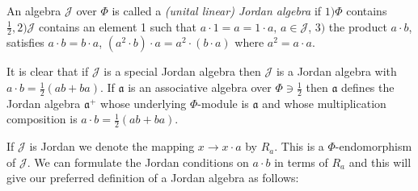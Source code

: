 \begin{dashdefi}
  An algebra $\mathscr{J}$ over $\Phi$ is called a {\em (unital
    linear) Jordan algebra} if $1) \Phi$ contains $\frac{1}{2}, 2)
  \mathscr{J}$ contains an element 1 such that $a\cdot 1=a=1\cdot a,\, a\in \mathscr{J}$,
  $3)$ the product $a\cdot b$, satisfies $a\cdot b=b\cdot a$,
  $(a^{2}\cdot b)\cdot a=a^{2}\cdot (b\cdot a)$ where $a^{2}=a\cdot
  a$. 

  It is clear that if $\mathscr{J}$ is a special Jordan algebra then
  $\mathscr{J}$ is  a Jordan algebra with $a\cdot
  b=\frac{1}{2}(ab+ba)$. If $\mathfrak{a}$ is an associative algebra
  over $\Phi \ni\frac{1}{2}$ then $\mathfrak{a}$ defines the Jordan
  algebra $\mathfrak{a}^{+}$ whose underlying $\Phi$-module is
  $\mathfrak{a}$ and whose multiplication composition is $a\cdot
  b=\frac{1}{2}(ab+ba)$. 

  If $\mathscr{J}$ is Jordan we denote the mapping $x\to x\cdot a$ by
  $R_{a}$. This is a $\Phi$-endomorphism of $\mathscr{J}$. We can
  formulate the Jordan conditions on $a\cdot b$ in terms of $R_a$ and
  this will give our preferred definition of a Jordan algebra as
  follows: 
\end{dashdefi}


